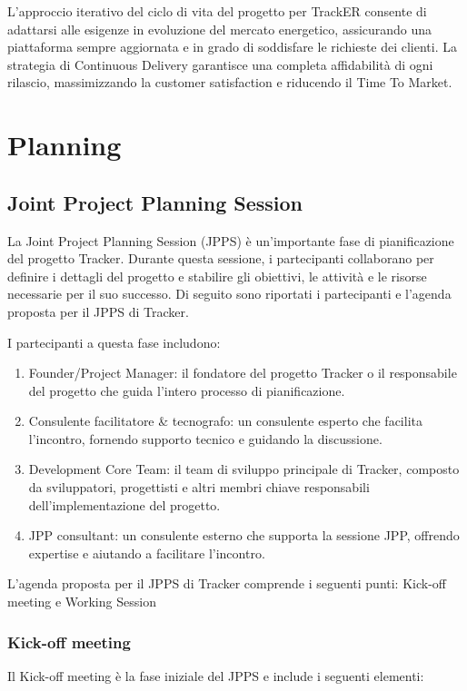\documentclass[oneside]{book}
\begin{document}
L'approccio iterativo del ciclo di vita del progetto per TrackER consente di adattarsi alle esigenze in evoluzione del mercato energetico, assicurando una piattaforma sempre aggiornata e in grado di soddisfare le richieste dei clienti. La strategia di Continuous Delivery garantisce una completa affidabilità di ogni rilascio, massimizzando la customer satisfaction e riducendo il Time To Market.

\chapter{Planning}

\section{Joint Project Planning Session}
La Joint Project Planning Session (JPPS) è un'importante fase di pianificazione del progetto Tracker. Durante questa sessione, i partecipanti collaborano per definire i dettagli del progetto e stabilire gli obiettivi, le attività e le risorse necessarie per il suo successo. Di seguito sono riportati i partecipanti e l'agenda proposta per il JPPS di Tracker.

I partecipanti a questa fase includono:

\begin{enumerate}
    \item Founder/Project Manager: il fondatore del progetto Tracker o il responsabile del progetto che guida l'intero processo di pianificazione.
    \item Consulente facilitatore \& tecnografo: un consulente esperto che facilita l'incontro, fornendo supporto tecnico e guidando la discussione.
    \item Development Core Team: il team di sviluppo principale di Tracker, composto da sviluppatori, progettisti e altri membri chiave responsabili dell'implementazione del progetto.
    \item JPP consultant: un consulente esterno che supporta la sessione JPP, offrendo expertise e aiutando a facilitare l'incontro.
\end{enumerate}

L'agenda proposta per il JPPS di Tracker comprende i seguenti punti: Kick-off meeting e Working Session

\subsection{Kick-off meeting}
Il Kick-off meeting è la fase iniziale del JPPS e include i seguenti elementi:
\end{document}
